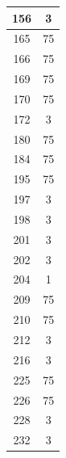 \documentclass[a4paper,12pt]{ltxdoc}
\begin{document}
\begin{table}[H]
\begin{minipage}{.4\textwidth}
\begin{tabular}{ | c | c | }
  156 & 3  \\ \hline
  165 & 75 \\ \hline
  166 & 75 \\ \hline
  169 & 75 \\ \hline
  170 & 75 \\ \hline
  172 & 3  \\ \hline
  180 & 75 \\ \hline
  184 & 75 \\ \hline
  195 & 75 \\ \hline
  197 & 3  \\ \hline
  198 & 3  \\ \hline
  201 & 3  \\ \hline
  202 & 3  \\ \hline
  204 & 1  \\ \hline
  209 & 75 \\ \hline
  210 & 75 \\ \hline
  212 & 3  \\ \hline
  216 & 3  \\ \hline
  225 & 75 \\ \hline
  226 & 75 \\ \hline
  228 & 3  \\ \hline
  232 & 3  \\ \hline
    \end{tabular}
  \end{minipage}
\end{table}
\end{document}
